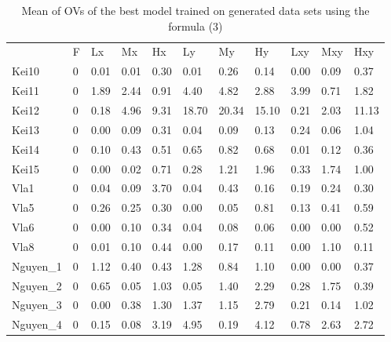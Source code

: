 \begin{center}
\begin{table}
\caption{Mean of OVs of the best model trained on generated data sets using the formula (3)}
\label{tab:OV}       %
\begin{tabular}{lllllllllll}
\hline\noalign{\smallskip}
& F & Lx & Mx & Hx & Ly & My & Hy & Lxy & Mxy & Hxy  \\
\noalign{\smallskip}\hline\noalign{\smallskip}
Kei10 & 0 & 0.01 & 0.01 & 0.30 & 0.01 & 0.26 & 0.14 & 0.00 & 0.09 & 0.37 \\
Kei11 & 0 & 1.89 & 2.44 & 0.91 & 4.40 & 4.82 & 2.88 & 3.99 & 0.71 & 1.82 \\
Kei12 & 0 & 0.18 & 4.96 & 9.31 & 18.70 & 20.34 & 15.10 & 0.21 & 2.03 & 11.13 \\
Kei13 & 0 & 0.00 & 0.09 & 0.31 & 0.04 & 0.09 & 0.13 & 0.24 & 0.06 & 1.04 \\
Kei14 & 0 & 0.10 & 0.43 & 0.51 & 0.65 & 0.82 & 0.68 & 0.01 & 0.12 & 0.36 \\
Kei15 & 0 & 0.00 & 0.02 & 0.71 & 0.28 & 1.21 & 1.96 & 0.33 & 1.74 & 1.00 \\
Vla1 & 0 & 0.04 & 0.09 & 3.70 & 0.04 & 0.43 & 0.16 & 0.19 & 0.24 & 0.30 \\
Vla5 & 0 & 0.26 & 0.25 & 0.30 & 0.00 & 0.05 & 0.81 & 0.13 & 0.41 & 0.59 \\
Vla6 & 0 & 0.00 & 0.10 & 0.34 & 0.04 & 0.08 & 0.06 & 0.00 & 0.00 & 0.52 \\
Vla8 & 0 & 0.01 & 0.10 & 0.44 & 0.00 & 0.17 & 0.11 & 0.00 & 1.10 & 0.11 \\
Nguyen\_1 & 0 & 1.12 & 0.40 & 0.43 & 1.28 & 0.84 & 1.10 & 0.00 & 0.00 & 0.37 \\
Nguyen\_2 & 0 & 0.65 & 0.05 & 1.03 & 0.05 & 1.40 & 2.29 & 0.28 & 1.75 & 0.39 \\
Nguyen\_3 & 0 & 0.00 & 0.38 & 1.30 & 1.37 & 1.15 & 2.79 & 0.21 & 0.14 & 1.02 \\
Nguyen\_4 & 0 & 0.15 & 0.08 & 3.19 & 4.95 & 0.19 & 4.12 & 0.78 & 2.63 & 2.72 \\



\end{tabular}
\end{table}
\end{center}
